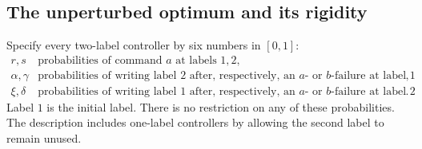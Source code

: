 \subsection{The unperturbed optimum and its rigidity}

Specify every two-label controller by six numbers in $[0,1]$:
\begin{equation}\label{eq:r80-six-parameters}
\begin{array}{c|l}
r,s&\text{probabilities of command $a$ at labels $1,2$},\\
\alpha,\gamma&\text{probabilities of writing label $2$ after,
respectively, an $a$- or $b$-failure at label $1$},\\
\xi,\delta&\text{probabilities of writing label $1$ after,
respectively, an $a$- or $b$-failure at label $2$}.
\end{array}
\end{equation}
Label $1$ is the initial label.  There is no restriction on any of
these probabilities.  The description includes one-label controllers
by allowing the second label to remain unused.

